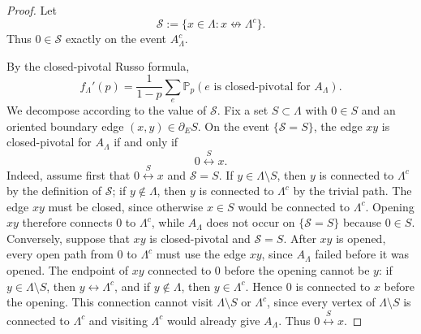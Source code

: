 \documentclass[11pt]{article}
\newcommand{\Pp}{\mathbb P_p}
\newcommand{\conn}{\longleftrightarrow}
\newcommand{\nconn}{\mathrel{\not\longleftrightarrow}}
\begin{document}
\begin{proof}
Let
\[
 \mathscr S:=\{x\in\Lambda:x\nconn \Lambda^c\}.
\]
Thus $0\in\mathscr S$ exactly on the event $A_\Lambda^c$.

By the closed-pivotal Russo formula,
\[
 f_\Lambda'(p)
 =
 \frac1{1-p}\sum_e
 \Pp(e\text{ is closed-pivotal for }A_\Lambda).
\]
We decompose according to the value of $\mathscr S$. Fix a set $S\subset\Lambda$ with $0\in S$ and an oriented boundary edge $(x,y)\in\partial_E S$. On the event $\{\mathscr S=S\}$, the edge $xy$ is closed-pivotal for $A_\Lambda$ if and only if
\[
 0\stackrel{S}{\conn}x.
\]
Indeed, assume first that $0\stackrel{S}{\conn}x$ and $\mathscr S=S$. If $y\in\Lambda\setminus S$, then $y$ is connected to $\Lambda^c$ by the definition of $\mathscr S$; if $y\notin\Lambda$, then $y$ is connected to $\Lambda^c$ by the trivial path. The edge $xy$ must be closed, since otherwise $x\in S$ would be connected to $\Lambda^c$. Opening $xy$ therefore connects $0$ to $\Lambda^c$, while $A_\Lambda$ does not occur on $\{\mathscr S=S\}$ because $0\in S$.
Conversely, suppose that $xy$ is closed-pivotal and $\mathscr S=S$. After $xy$ is opened, every open path from $0$ to $\Lambda^c$ must use the edge $xy$, since $A_\Lambda$ failed before it was opened. The endpoint of $xy$ connected to $0$ before the opening cannot be $y$: if $y\in\Lambda\setminus S$, then $y\conn\Lambda^c$, and if $y\notin\Lambda$, then $y\in\Lambda^c$. Hence $0$ is connected to $x$ before the opening. This connection cannot visit $\Lambda\setminus S$ or $\Lambda^c$, since every vertex of $\Lambda\setminus S$ is connected to $\Lambda^c$ and visiting $\Lambda^c$ would already give $A_\Lambda$. Thus $0\stackrel{S}{\conn}x$.


\end{proof}
\end{document}
